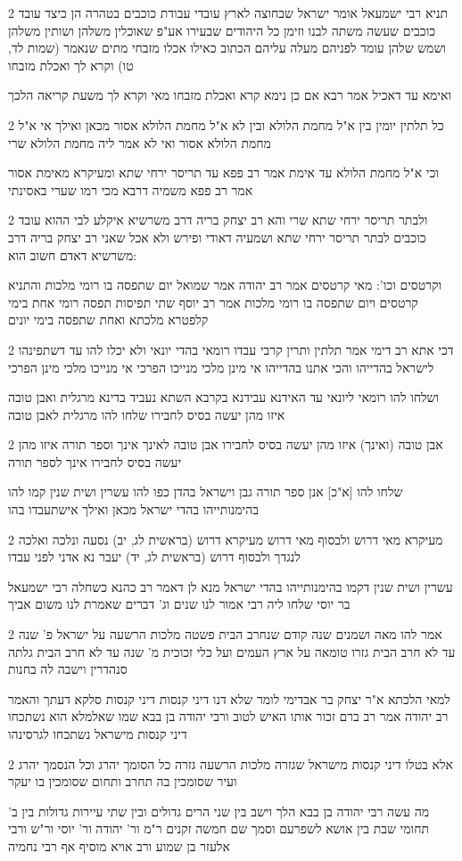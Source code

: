 \documentclass[12pt, openany]{book}
\newcommand{\sethebfont}{
\fontsize{10.5pt}{21.0pt} \selectfont
}
\newcommand{\twocol}[1]{
	{\sethebfont \begin{multicols}{2}
			#1
	\end{multicols}}	
}
\begin{document}
\twocol{תניא רבי ישמעאל אומר ישראל שבחוצה לארץ עובדי עבודת כוכבים בטהרה הן כיצד עובד כוכבים שעשה משתה לבנו וזימן כל היהודים שבעירו אע"פ שאוכלין משלהן ושותין משלהן ושמש שלהן עומד לפניהם מעלה עליהם הכתוב כאילו אכלו מזבחי מתים שנאמר (שמות לד, טו) וקרא לך ואכלת מזבחו
\par ואימא עד דאכיל אמר רבא אם כן נימא קרא ואכלת מזבחו מאי וקרא לך משעת קריאה הלכך}
\twocol{כל תלתין יומין בין א"ל מחמת הלולא ובין לא א"ל מחמת הלולא אסור מכאן ואילך אי א"ל מחמת הלולא אסור ואי לא אמר ליה מחמת הלולא שרי
\par וכי א"ל מחמת הלולא עד אימת אמר רב פפא עד תריסר ירחי שתא ומעיקרא מאימת אסור אמר רב פפא משמיה דרבא מכי רמו שערי באסינתי}
\twocol{ולבתר תריסר ירחי שתא שרי והא רב יצחק בריה דרב משרשיא איקלע לבי ההוא עובד כוכבים לבתר תריסר ירחי שתא ושמעיה דאודי ופירש ולא אכל שאני רב יצחק בריה דרב משרשיא דאדם חשוב הוא:
\par וקרטסים וכו': מאי קרטסים אמר רב יהודה אמר שמואל יום שתפסה בו רומי מלכות והתניא קרטסים ויום שתפסה בו רומי מלכות אמר רב יוסף שתי תפיסות תפסה רומי אחת בימי קלפטרא מלכתא ואחת שתפסה בימי יונים}
\twocol{דכי אתא רב דימי אמר תלתין ותרין קרבי עבדו רומאי בהדי יונאי ולא יכלו להו עד דשתפינהו לישראל בהדייהו והכי אתנו בהדייהו אי מינן מלכי מנייכו הפרכי אי מנייכו מלכי מינן הפרכי
\par ושלחו להו רומאי ליונאי עד האידנא עבידנא בקרבא השתא נעביד בדינא מרגלית ואבן טובה איזו מהן יעשה בסיס לחבירו שלחו להו מרגלית לאבן טובה}
\twocol{אבן טובה (ואינך) איזו מהן יעשה בסיס לחבירו אבן טובה לאינך אינך וספר תורה איזו מהן יעשה בסיס לחבירו אינך לספר תורה
\par שלחו להו [א"כ] אנן ספר תורה גבן וישראל בהדן כפו להו עשרין ושית שנין קמו להו בהימנותייהו בהדי ישראל מכאן ואילך אישתעבדו בהו}
\twocol{מעיקרא מאי דרוש ולבסוף מאי דרוש מעיקרא דרוש (בראשית לג, יב) נסעה ונלכה ואלכה לנגדך ולבסוף דרוש (בראשית לג, יד) יעבר נא אדני לפני עבדו
\par עשרין ושית שנין דקמו בהימנותייהו בהדי ישראל מנא לן דאמר רב כהנא כשחלה רבי ישמעאל בר יוסי שלחו ליה רבי אמור לנו שנים וג' דברים שאמרת לנו משום אביך}
\twocol{אמר להו מאה ושמנים שנה קודם שנחרב הבית פשטה מלכות הרשעה על ישראל פ' שנה עד לא חרב הבית גזרו טומאה על ארץ העמים ועל כלי זכוכית מ' שנה עד לא חרב הבית גלתה סנהדרין וישבה לה בחנות
\par למאי הלכתא א"ר יצחק בר אבדימי לומר שלא דנו דיני קנסות דיני קנסות סלקא דעתך והאמר רב יהודה אמר רב ברם זכור אותו האיש לטוב ורבי יהודה בן בבא שמו שאלמלא הוא נשתכחו דיני קנסות מישראל נשתכחו לגרסינהו}
\twocol{אלא בטלו דיני קנסות מישראל שגזרה מלכות הרשעה גזרה כל הסומך יהרג וכל הנסמך יהרג ועיר שסומכין בה תחרב ותחום שסומכין בו יעקר
\par מה עשה רבי יהודה בן בבא הלך וישב בין שני הרים גדולים ובין שתי עיירות גדולות בין ב' תחומי שבת בין אושא לשפרעם וסמך שם חמשה זקנים ר"מ ור' יהודה ור' יוסי ור"ש ורבי אלעזר בן שמוע ורב אויא מוסיף אף רבי נחמיה}
\end{document}
